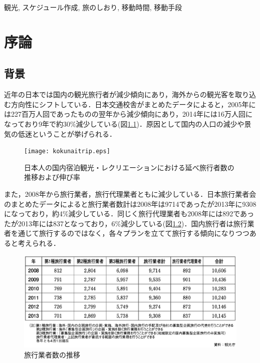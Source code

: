 \documentclass{funthesis}
\begin{document}
\begin{jkeyword}
観光, スケジュール作成, 旅のしおり, 移動時間, 移動手段
\end{jkeyword}

\tableofcontents %


\chapter{序論} %



\section{背景}
近年の日本では国内の観光旅行者が減少傾向にあり，海外からの観光客を取り込む方向性にシフトしている．日本交通校舎がまとめたデータ\cite{kokunaitrip}によると，2005年には227百万人回であったものの翌年から減少傾向にあり，2014年には16万人回になっており9年で約30\%減少している(図\ref{kokunai})．原因として国内の人口の減少や景気の低迷ということが挙げられる．

\begin{figure}[htpb]
\begin{center}
\texttt{[image: kokunaitrip.eps]}
\end{center}
\caption{日本人の国内宿泊観光・レクリエーションにおける延べ旅行者数の推移および伸び率}
\label{kokunai}
\end{figure}

また，2008年から旅行業者，旅行代理業者ともに減少している．日本旅行業者会のまとめたデータ\cite{ryokougyokai}によると旅行業者数計は2008年は9714であったが2013年に9308になっており，約4\%減少している．同じく旅行代理業者も2008年には892であったが2013年には837となっており，6\%減少している(図\ref{gyosya})．国内旅行者は旅行業者を通じて旅行するのではなく，各々プランを立てて旅行する傾向になりつつあると考えられる．

\begin{figure}[htpb]
\begin{center}
\includegraphics[scale=0.68]{tripgyosya.eps}
\end{center}
\caption{旅行業者数の推移}
\label{gyosya}
\end{figure}
\end{document}
